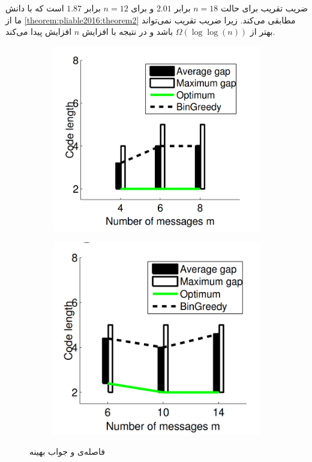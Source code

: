 	ضریب تقریب برای حالت
	$n = 18$
	برابر
	$2.01$
	و برای
	$n = 12$
	برابر
	$1.87$
	است که با دانش ما از
	\autoref{theorem:pliable2016:theorem2}
	مطابقی می‌کند. زیرا ضریب تقریب نمی‌تواند بهتر از
	$\Omega(\log \log (n))$
	باشد و در نتیجه با افزایش
	$n$
	افزایش پیدا می‌کند.
 \begin{figure}
	\centering
	\begin{subfigure}[b]{0.45\textwidth}
		\centering
		\includegraphics[width=1\linewidth]{figs/ch3/pliable2016_3a}
		\caption{}
		\label{fig:pliable20163a}
	\end{subfigure}
	\hfill
	\begin{subfigure}[b]{0.45\textwidth}
		\centering
		\includegraphics[width=1\linewidth]{figs/ch3/pliable2016_3b}
		\caption{}
		\label{fig:pliable20163b}
	\end{subfigure}
	\caption{
		فاصله‌ی 
		و جواب بهینه
	}
	\label{fig:pliable20163}
\end{figure}








